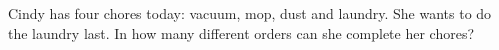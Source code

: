Cindy has four chores today: vacuum, mop, dust and laundry. She wants to do the laundry last. In how many different orders can she complete her chores?
